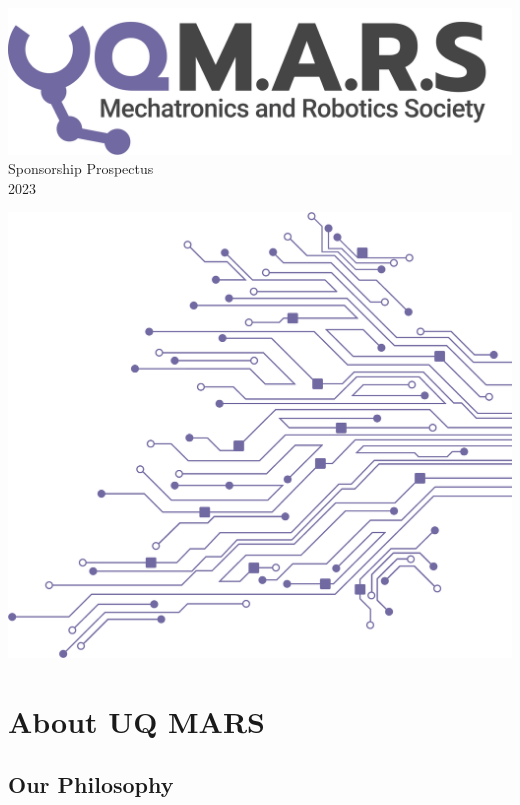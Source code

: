 \documentclass[a4paper,12pt]{report}
\begin{document}
\begin{titlepage}
    \begin{center}
        \vspace*{15mm}
        \includegraphics[width=0.7\paperwidth]{../assets/Logo (Dark).png} \\
        \vspace{1cm}
        \Huge Sponsorship Prospectus \\
        \huge \textcolor{turbo_purple}{2023}
    \end{center}
    \vfill
    \includegraphics[height=0.5\paperheight, right]{../assets/Pattern - PCB (Solid).png}
    \vspace*{10mm}
\end{titlepage}
\restoregeometry

\section*{About UQ MARS}
\subsection*{Our Philosophy}
\end{document}
